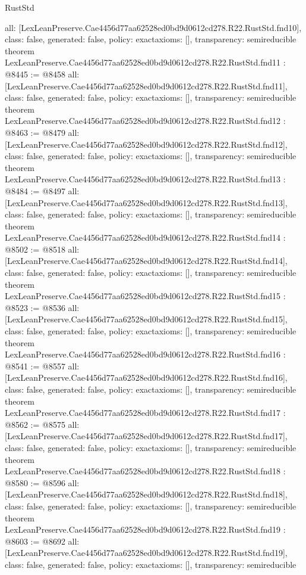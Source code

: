 \begin{lexlean}{RustStd}
\begin{coremodule}
{  all: [LexLeanPreserve.Cae4456d77aa62528ed0bd9d0612cd278.R22.RustStd.fnd10],
  class: false,
  generated: false,
  policy: exact{axioms: []},
  transparency: semireducible
}
theorem LexLeanPreserve.Cae4456d77aa62528ed0bd9d0612cd278.R22.RustStd.fnd11 : @8445 := @8458 {
  all: [LexLeanPreserve.Cae4456d77aa62528ed0bd9d0612cd278.R22.RustStd.fnd11],
  class: false,
  generated: false,
  policy: exact{axioms: []},
  transparency: semireducible
}
theorem LexLeanPreserve.Cae4456d77aa62528ed0bd9d0612cd278.R22.RustStd.fnd12 : @8463 := @8479 {
  all: [LexLeanPreserve.Cae4456d77aa62528ed0bd9d0612cd278.R22.RustStd.fnd12],
  class: false,
  generated: false,
  policy: exact{axioms: []},
  transparency: semireducible
}
theorem LexLeanPreserve.Cae4456d77aa62528ed0bd9d0612cd278.R22.RustStd.fnd13 : @8484 := @8497 {
  all: [LexLeanPreserve.Cae4456d77aa62528ed0bd9d0612cd278.R22.RustStd.fnd13],
  class: false,
  generated: false,
  policy: exact{axioms: []},
  transparency: semireducible
}
theorem LexLeanPreserve.Cae4456d77aa62528ed0bd9d0612cd278.R22.RustStd.fnd14 : @8502 := @8518 {
  all: [LexLeanPreserve.Cae4456d77aa62528ed0bd9d0612cd278.R22.RustStd.fnd14],
  class: false,
  generated: false,
  policy: exact{axioms: []},
  transparency: semireducible
}
theorem LexLeanPreserve.Cae4456d77aa62528ed0bd9d0612cd278.R22.RustStd.fnd15 : @8523 := @8536 {
  all: [LexLeanPreserve.Cae4456d77aa62528ed0bd9d0612cd278.R22.RustStd.fnd15],
  class: false,
  generated: false,
  policy: exact{axioms: []},
  transparency: semireducible
}
theorem LexLeanPreserve.Cae4456d77aa62528ed0bd9d0612cd278.R22.RustStd.fnd16 : @8541 := @8557 {
  all: [LexLeanPreserve.Cae4456d77aa62528ed0bd9d0612cd278.R22.RustStd.fnd16],
  class: false,
  generated: false,
  policy: exact{axioms: []},
  transparency: semireducible
}
theorem LexLeanPreserve.Cae4456d77aa62528ed0bd9d0612cd278.R22.RustStd.fnd17 : @8562 := @8575 {
  all: [LexLeanPreserve.Cae4456d77aa62528ed0bd9d0612cd278.R22.RustStd.fnd17],
  class: false,
  generated: false,
  policy: exact{axioms: []},
  transparency: semireducible
}
theorem LexLeanPreserve.Cae4456d77aa62528ed0bd9d0612cd278.R22.RustStd.fnd18 : @8580 := @8596 {
  all: [LexLeanPreserve.Cae4456d77aa62528ed0bd9d0612cd278.R22.RustStd.fnd18],
  class: false,
  generated: false,
  policy: exact{axioms: []},
  transparency: semireducible
}
theorem LexLeanPreserve.Cae4456d77aa62528ed0bd9d0612cd278.R22.RustStd.fnd19 : @8603 := @8692 {
  all: [LexLeanPreserve.Cae4456d77aa62528ed0bd9d0612cd278.R22.RustStd.fnd19],
  class: false,
  generated: false,
  policy: exact{axioms: []},
  transparency: semireducible
}
\end{coremodule}
\end{lexlean}
